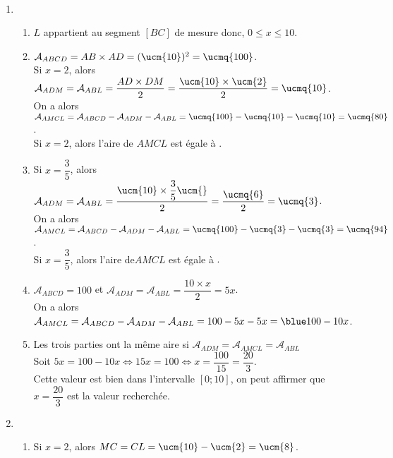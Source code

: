 \ \\ [-5mm]
   \begin{enumerate}
      \item
         \begin{enumerate}
            \item $L$ appartient au segment $[BC]$ de mesure  donc, {\blue $0\leq x\leq10$}. \smallskip
           \item $\mathcal{A}_{ABCD} =AB\times AD =(\ucm{10})^2 =\ucmq{100}$. \\ [1mm]
              Si $x =2$, alors $\mathcal{A}_{ADM} =\mathcal{A}_{ABL} =\dfrac{AD\times DM}{2} =\dfrac{\ucm{10}\times\ucm{2}}{2} =\ucmq{10}$. \\ [1mm]
              On a alors $\mathcal{A}_{AMCL} =\mathcal{A}_{ABCD}-\mathcal{A}_{ADM}-\mathcal{A}_{ABL} =\ucmq{100}-\ucmq{10}-\ucmq{10} =\ucmq{80}$. \\ [1mm]
              {\blue Si $x =2$, alors l’aire de $AMCL$ est égale à }.
            \item Si $x =\dfrac35$, alors $\mathcal{A}_{ADM} =\mathcal{A}_{ABL} =\dfrac{\ucm{10}\times\dfrac35\ucm{}}{2} =\dfrac{\ucmq{6}}{2} =\ucmq{3}$. \\ [1mm]
              On a alors $\mathcal{A}_{AMCL} =\mathcal{A}_{ABCD}-\mathcal{A}_{ADM}-\mathcal{A}_{ABL} =\ucmq{100}-\ucmq{3}-\ucmq{3} =\ucmq{94}$. \\ [1mm]
              {\blue Si $x =\dfrac35$, alors l’aire de$AMCL$ est égale à }. \smallskip
            \item $\mathcal{A}_{ABCD} =100$ et $\mathcal{A}_{ADM} =\mathcal{A}_{ABL} =\dfrac{10\times x}{2} =5x$. \\ [1mm]
              On a alors $\mathcal{A}_{AMCL} =\mathcal{A}_{ABCD}-\mathcal{A}_{ADM}-\mathcal{A}_{ABL} =100-5x-5x ={\blue 100-10x}$.
            \item Les trois parties ont la même aire si $\mathcal{A}_{ADM} =\mathcal{A}_{AMCL} =\mathcal{A}_{ABL}$ \\ [1mm]
               Soit $5x =100-10x \iff 15x =100 \iff x =\dfrac{100}{15} =\dfrac{20}{3}$. \\ [1mm]
               Cette valeur est bien dans l'intervalle $[0;10]$, on peut affirmer que {\blue $x =\dfrac{20}{3}$ est la valeur recherchée}.
         \end{enumerate}
      \setcounter{enumi}{1}
      \item
         \begin{enumerate}
            \item Si $x =2$, alors $MC =CL =\ucm{10} -\ucm{2} =\ucm{8}$. \\ [1mm]

\end{enumerate}
\end{enumerate}
